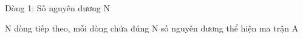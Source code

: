 Dòng 1: Số nguyên dương N

N dòng tiếp theo, mỗi dòng chứa đúng N số nguyên dương thể hiện ma trận A